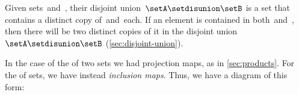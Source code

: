%
%
%
%

Given sets~\setA and~\setB, their disjoint union~$\setA \setdisunion \setB$ is a set that contains a distinct copy of~\setA and~\setB each.
If an element is contained in both~\setA and~\setB, then there will be two distinct copies of it in the disjoint union~$\setA \setdisunion \setB$ (\cref{sec:disjoint-union}).


In the case of the  of two sets we had projection maps, as in \cref{sec:products}.
For the  of sets, we have instead \emph{inclusion maps}.
Thus, we have a diagram of this form:

